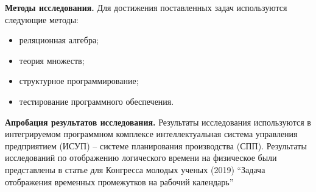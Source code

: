 \indent \textbf{Методы исследования.}
Для достижения поставленных задач используются следующие методы:
\begin{itemize}
	\item реляционная алгебра;
	\item теория множеств;
	\item структурное программирование;
	\item тестирование программного обеспечения.
\end{itemize}

\indent \textbf{Апробация результатов исследования.}
Результаты исследования используются в интегрируемом программном комплексе интеллектуальная система управления предприятием (ИСУП) – системе планирования производства (СПП).%
Результаты исследований по отображению логического времени на физическое были представлены в статье для Конгресса молодых ученых (2019) ``Задача отображения временных промежутков на рабочий календарь''